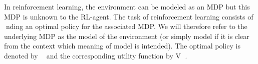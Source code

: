 


In reinforcement learning, the environment can be modeled as an MDP but
this MDP is unknown to the RL-agent. The task of reinforcement learning
consists of nding an optimal policy for the associated MDP. We will therefore
refer to the underlying MDP as the model of the environment (or simply model
if it is clear from the context which meaning of model is intended). The optimal
policy is denoted by  and the corresponding utility function by V .

